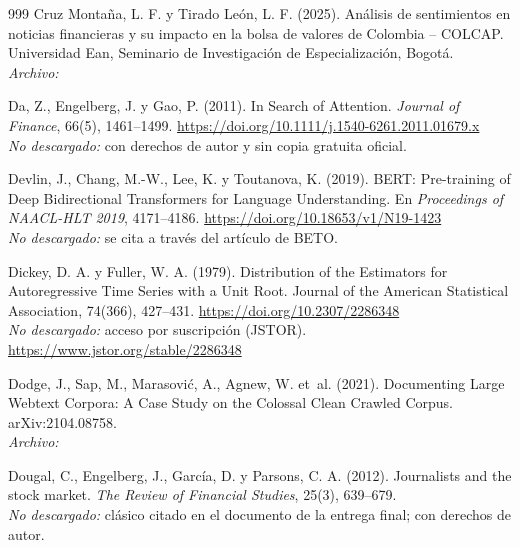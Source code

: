 \begin{thebibliography}{999}
Cruz Monta{\~n}a, L. F. y Tirado Le{\'o}n, L. F. (2025). An{\'a}lisis de sentimientos en noticias financieras y su impacto en la bolsa de valores de {Colombia} -- {COLCAP}. Universidad Ean, Seminario de Investigaci{\'o}n de Especializaci{\'o}n, Bogot{\'a}.
\\\textit{Archivo:} 

Da, Z., Engelberg, J. y Gao, P. (2011). In Search of Attention. \emph{Journal of Finance}, 66(5), 1461--1499. \url{https://doi.org/10.1111/j.1540-6261.2011.01679.x}
\\\textit{No descargado:} con derechos de autor y sin copia gratuita oficial.

Devlin, J., Chang, M.-W., Lee, K. y Toutanova, K. (2019). {BERT}: Pre-training of Deep Bidirectional Transformers for Language Understanding. En \emph{Proceedings of NAACL-HLT 2019}, 4171--4186. \url{https://doi.org/10.18653/v1/N19-1423}
\\\textit{No descargado:} se cita a través del artículo de BETO.

Dickey, D. A. y Fuller, W. A. (1979). Distribution of the Estimators for Autoregressive Time Series with a Unit Root. Journal of the American Statistical Association, 74(366), 427–431. \url{https://doi.org/10.2307/2286348}
\\\textit{No descargado:} acceso por suscripción (JSTOR). \url{https://www.jstor.org/stable/2286348}

Dodge, J., Sap, M., Marasovi{\'c}, A., Agnew, W. et~al. (2021). Documenting Large Webtext Corpora: A Case Study on the Colossal Clean Crawled Corpus. arXiv:2104.08758.
\\\textit{Archivo:} 

Dougal, C., Engelberg, J., García, D. y Parsons, C. A. (2012). Journalists and the stock market. \emph{The Review of Financial Studies}, 25(3), 639--679.
\\\textit{No descargado:} clásico citado en el documento de la entrega final; con derechos de autor.


\end{thebibliography}
